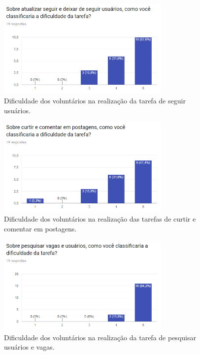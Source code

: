 \begin{figure}[h]
    \caption{Dificuldade dos voluntários na realização da tarefa de seguir usuários.}
       	\begin{center}
            \includegraphics[width=0.75\textwidth]{figuras/avaliacao/pdv-3.png}
        \end{center}
    \label{avalGrafTUSeguir}
\end{figure} 

\begin{figure}[h]
    \caption{Dificuldade dos voluntários na realização das tarefas de curtir e comentar em postagens.}
       	\begin{center}
            \includegraphics[width=0.75\textwidth]{figuras/avaliacao/pdv-4.png}
        \end{center}
    \label{avalGrafTUCurtir}
\end{figure} 

\begin{figure}[H]
    \caption{Dificuldade dos voluntários na realização da tarefa de pesquisar usuários e vagas.}
       	\begin{center}
            \includegraphics[width=0.75\textwidth]{figuras/avaliacao/pdv-5.png}
        \end{center}
    \label{avalGrafTUPesquisar}
\end{figure} 

